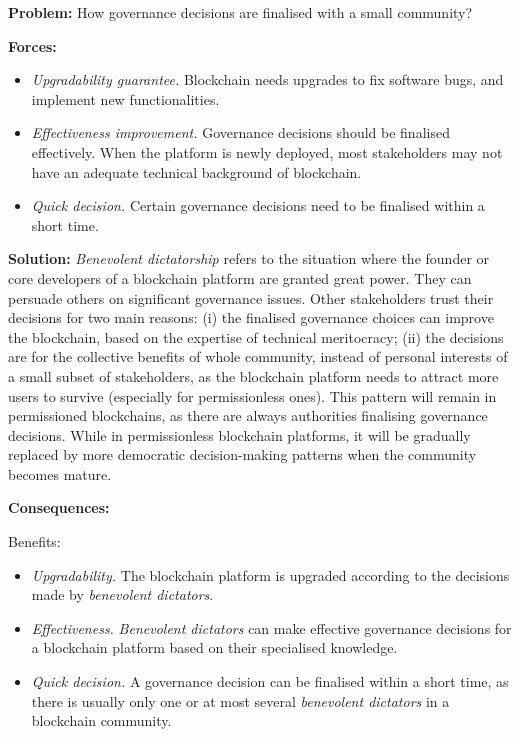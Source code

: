 \documentclass{article}
\begin{document}
\vspace{0.5em}\noindent \textbf{Problem:} How governance decisions are finalised with a small community?

\vspace{0.5em}\noindent \textbf{Forces:} 

\begin{itemize}
  \item \textit{Upgradability guarantee.} Blockchain needs upgrades to fix software bugs, and implement new functionalities.

  \item \textit{Effectiveness improvement.} Governance decisions should be finalised effectively. When the platform is newly deployed, most stakeholders may not have an adequate technical background of blockchain.


  \item \textit{Quick decision.} Certain governance decisions need to be finalised within a short time.
\end{itemize}



\vspace{0.5em}\noindent \textbf{Solution:} 
\textit{Benevolent dictatorship} refers to the situation where the founder or core developers of a blockchain platform are granted great power. They can persuade others on significant governance issues. Other stakeholders trust their decisions for two main reasons: (i) the finalised governance choices can improve the blockchain, based on the expertise of technical meritocracy; (ii) the decisions are for the collective benefits of whole community, instead of personal interests of a small subset of stakeholders, as the blockchain platform needs to attract more users to survive (especially for permissionless ones). This pattern will remain in permissioned blockchains, as there are always authorities finalising governance decisions. While in permissionless blockchain platforms, it will be gradually replaced by more democratic decision-making patterns when the community becomes mature.


\vspace{0.5em}\noindent \textbf{Consequences:} 

Benefits:
\begin{itemize}
  \item \textit{Upgradability.} The blockchain platform is upgraded according to the decisions made by \textit{benevolent dictators}.
  
  \item \textit{Effectiveness.} \textit{Benevolent dictators} can make effective governance decisions for a blockchain platform based on their specialised knowledge.
    
  \item \textit{Quick decision.} A governance decision can be finalised within a short time, as there is usually only one or at most several \textit{benevolent dictators} in a blockchain community.
\end{itemize}
\end{document}
